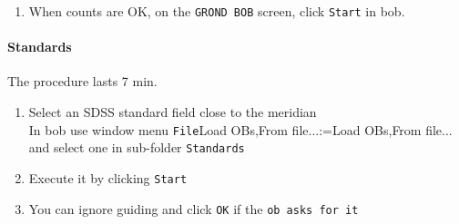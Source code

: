 \documentclass[11pt,fleqn,a4paper]{book}
\makeatletter
\def\menu#1#2{\texttt{#1}\ifx{}#2\else\@for\@x:=#2\do{$\rightarrow$\texttt{\@x}}\fi}
\def\wmenu#1#2{window menu \menu{#1}{#2}}
\def\fetchob{\wmenu{File}{Load OBs,From file...}}
\makeatother
\begin{document}
\begin{enumerate}
\begin{enumerate}
              \begin{itemize} 
                 \item Find window \texttt{Infrared Acquisition Module} (see ).
                 \item Close to the \texttt{INTEGRATION TIME}, fill in value 2.
                 \item Press enter (Don't do \texttt{Apply}.)
              \end{itemize}
           \item Draw cuts in the infrared image.
              \begin{itemize}
                 \item Go the the \gls{irtd} window.
                 \item Go the the $J$-band (right handside)
                 \item Use \wmenu{View}{Cuts…}, then click \texttt{OK} on the pop-up (Figures \ref{fig:grondff-2}--\ref{fig:grondff-3}).
                 \item Draw a diagonal on the image with the mouse.
              \end{itemize}
           \item Wait for the cuts to look flat and with about 20\,000 counts.
            (Figures~\ref{fig:grondff-4}--\ref{fig:grondff-5})\\
           This should occur when the sun is about 4 degrees below the horizon.
        \end{enumerate}
  \item When counts are OK, on the \texttt{GROND BOB} screen, click \texttt{Start} in \gls{bob}. 
\end{enumerate}

\paragraph{Standards}

The procedure lasts 7 min.
\begin{enumerate}
       \item Select an SDSS \gls{standard field} close to the meridian\\
             In \gls{bob} use \fetchob{} and select one in sub-folder \texttt{Standards}
       \item Execute it by clicking \texttt{Start}
       \item You can ignore guiding and click \texttt{OK} if the \texttt{ob asks for it}
\end{enumerate}
\end{document}
